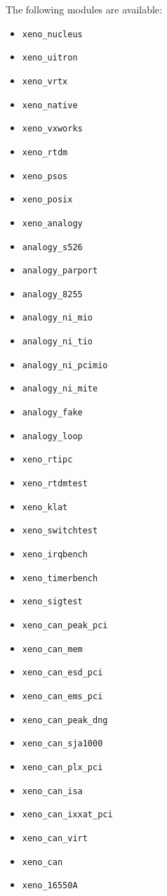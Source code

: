 \documentclass[11pt]{book}
\begin{document}
   The following modules are available:
   \begin{itemize}
      \item \texttt{xeno\_nucleus}
      \item \texttt{xeno\_uitron}
      \item \texttt{xeno\_vrtx}
      \item \texttt{xeno\_native}
      \item \texttt{xeno\_vxworks}
      \item \texttt{xeno\_rtdm}
      \item \texttt{xeno\_psos}
      \item \texttt{xeno\_posix}
      \item \texttt{xeno\_analogy}
      \item \texttt{analogy\_s526}
      \item \texttt{analogy\_parport}
      \item \texttt{analogy\_8255}
      \item \texttt{analogy\_ni\_mio}
      \item \texttt{analogy\_ni\_tio}
      \item \texttt{analogy\_ni\_pcimio}
      \item \texttt{analogy\_ni\_mite}
      \item \texttt{analogy\_fake}
      \item \texttt{analogy\_loop}
      \item \texttt{xeno\_rtipc}
      \item \texttt{xeno\_rtdmtest}
      \item \texttt{xeno\_klat}
      \item \texttt{xeno\_switchtest}
      \item \texttt{xeno\_irqbench}
      \item \texttt{xeno\_timerbench}
      \item \texttt{xeno\_sigtest}
      \item \texttt{xeno\_can\_peak\_pci}
      \item \texttt{xeno\_can\_mem}
      \item \texttt{xeno\_can\_esd\_pci}
      \item \texttt{xeno\_can\_ems\_pci}
      \item \texttt{xeno\_can\_peak\_dng}
      \item \texttt{xeno\_can\_sja1000}
      \item \texttt{xeno\_can\_plx\_pci}
      \item \texttt{xeno\_can\_isa}
      \item \texttt{xeno\_can\_ixxat\_pci}
      \item \texttt{xeno\_can\_virt}
      \item \texttt{xeno\_can}
      \item \texttt{xeno\_16550A}
   \end{itemize}
\end{document}
